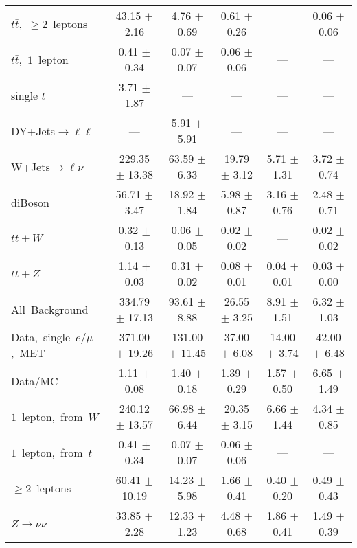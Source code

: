 \documentclass{article}
\begin{document}
\begin{longtable}{|l|c|c|c|c|c|}
$t\bar{t}$,~$\ge2$~leptons & 43.15 $\pm$ 2.16  & 4.76 $\pm$ 0.69  & 0.61 $\pm$ 0.26  & ---  & 0.06 $\pm$ 0.06 \\* 
$t\bar{t}$,~$1$~lepton & 0.41 $\pm$ 0.34  & 0.07 $\pm$ 0.07  & 0.06 $\pm$ 0.06  & ---  & --- \\* 
single $t$  & 3.71 $\pm$ 1.87  & ---  & ---  & ---  & --- \\* 
DY+Jets$\rightarrow\ell\ell$  & ---  & 5.91 $\pm$ 5.91  & ---  & ---  & --- \\* 
W+Jets$\rightarrow\ell\nu$  & 229.35 $\pm$ 13.38  & 63.59 $\pm$ 6.33  & 19.79 $\pm$ 3.12  & 5.71 $\pm$ 1.31  & 3.72 $\pm$ 0.74 \\* 
diBoson  & 56.71 $\pm$ 3.47  & 18.92 $\pm$ 1.84  & 5.98 $\pm$ 0.87  & 3.16 $\pm$ 0.76  & 2.48 $\pm$ 0.71 \\* 
$t\bar{t}+W$  & 0.32 $\pm$ 0.13  & 0.06 $\pm$ 0.05  & 0.02 $\pm$ 0.02  & ---  & 0.02 $\pm$ 0.02 \\* 
$t\bar{t}+Z$  & 1.14 $\pm$ 0.03  & 0.31 $\pm$ 0.02  & 0.08 $\pm$ 0.01  & 0.04 $\pm$ 0.01  & 0.03 $\pm$ 0.00 \\* 
\hline \hline 
All~Background  & 334.79 $\pm$ 17.13  & 93.61 $\pm$ 8.88  & 26.55 $\pm$ 3.25  & 8.91 $\pm$ 1.51  & 6.32 $\pm$ 1.03 \\* 
Data,~single~$e/\mu$,~MET  & 371.00 $\pm$ 19.26  & 131.00 $\pm$ 11.45  & 37.00 $\pm$ 6.08  & 14.00 $\pm$ 3.74  & 42.00 $\pm$ 6.48 \\* 
Data/MC  & 1.11 $\pm$ 0.08  & 1.40 $\pm$ 0.18  & 1.39 $\pm$ 0.29  & 1.57 $\pm$ 0.50  & 6.65 $\pm$ 1.49 \\* 
\hline \hline 
$1$~lepton,~from~$W$  & 240.12 $\pm$ 13.57  & 66.98 $\pm$ 6.44  & 20.35 $\pm$ 3.15  & 6.66 $\pm$ 1.44  & 4.34 $\pm$ 0.85 \\* 
$1$~lepton,~from~$t$  & 0.41 $\pm$ 0.34  & 0.07 $\pm$ 0.07  & 0.06 $\pm$ 0.06  & ---  & --- \\* 
$\ge2$~leptons  & 60.41 $\pm$ 10.19  & 14.23 $\pm$ 5.98  & 1.66 $\pm$ 0.41  & 0.40 $\pm$ 0.20  & 0.49 $\pm$ 0.43 \\* 
$Z\rightarrow\nu\nu$  & 33.85 $\pm$ 2.28  & 12.33 $\pm$ 1.23  & 4.48 $\pm$ 0.68  & 1.86 $\pm$ 0.41  & 1.49 $\pm$ 0.39 \\* 
\hline 
\end{longtable} 

 
 
 
 
\pagebreak 

 
 
 
 
\end{document}
